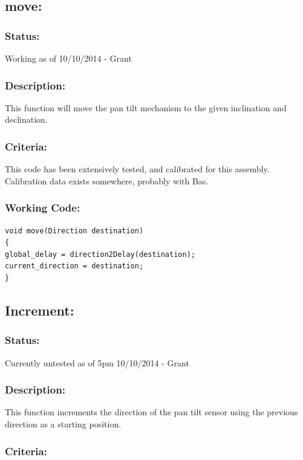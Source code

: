 \documentclass[]{report}
\begin{document}
\subsection{move:}
\subsubsection{Status:}
Working as of 10/10/2014 - Grant

\subsubsection{Description:} 
This function will move the pan tilt mechanism to the given inclination and declination.

\subsubsection{Criteria:}
This code has been extensively tested, and calibrated for this assembly. Calibration data exists somewhere, probably with Bas.

\subsubsection{Working Code:}
\begin{lstlisting}
void move(Direction destination)
{
global_delay = direction2Delay(destination);
current_direction = destination;
}
\end{lstlisting}

\subsection{Increment:}
\subsubsection{Status:}
Currently untested as of 5pm 10/10/2014 - Grant

\subsubsection{Description:}
This function increments the direction of the pan tilt sensor using the previous direction as a starting position.

\subsubsection{Criteria:}
\end{document}
